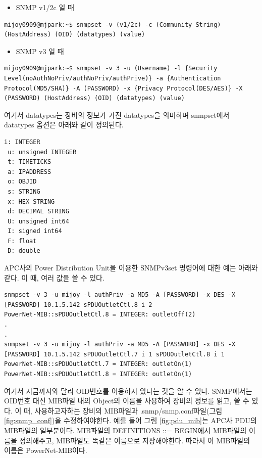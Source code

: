 \documentclass[11pt
  , a4paper
  , article
  , oneside
]{memoir}
\begin{document}
\begin{itemize}
\item SNMP v1/2c 일 때
\end{itemize}

\begin{lstlisting}[style=termstyle]
mijoy0909@mjpark:~$ snmpset -v (v1/2c) -c (Community String) (HostAddress) (OID) (datatypes) (value)
\end{lstlisting}

\begin{itemize}
\item SNMP v3 일 때
\end{itemize}

\begin{lstlisting}[style=termstyle]
mijoy0909@mjpark:~$ snmpset -v 3 -u (Username) -l {Security Level(noAuthNoPriv/authNoPriv/authPrive)} -a {Authentication Protocol(MD5/SHA)} -A (PASSWORD) -x {Privacy Protocol(DES/AES)} -X (PASSWORD) (HostAddress) (OID) (datatypes) (value)
\end{lstlisting}

여기서 datatypes는 장비의 정보가 가진 datatypes을 의미하며 snmpset에서 datatypes 옵션은 아래와 같이 정의된다.

\begin{lstlisting}[style=termstyle]
 i: INTEGER 
 u: unsigned INTEGER 
 t: TIMETICKS
 a: IPADDRESS
 o: OBJID
 s: STRING
 x: HEX STRING
 d: DECIMAL STRING
 U: unsigned int64
 I: signed int64
 F: float
 D: double
\end{lstlisting}

APC사의 Power Distribution Unit을 이용한 SNMPv3set 명령어에 대한 예는 아래와 같다. 이 때, 여러 값을 쓸 수 있다.

\begin{lstlisting}[style=termstyle]
snmpset -v 3 -u mijoy -l authPriv -a MD5 -A [PASSWORD] -x DES -X [PASSWORD] 10.1.5.142 sPDUOutletCtl.8 i 2
PowerNet-MIB::sPDUOutletCtl.8 = INTEGER: outletOff(2)
.
.
snmpset -v 3 -u mijoy -l authPriv -a MD5 -A [PASSWORD] -x DES -X [PASSWORD] 10.1.5.142 sPDUOutletCtl.7 i 1 sPDUOutletCtl.8 i 1
PowerNet-MIB::sPDUOutletCtl.7 = INTEGER: outletOn(1)
PowerNet-MIB::sPDUOutletCtl.8 = INTEGER: outletOn(1)
\end{lstlisting}

여기서 지금까지와 달리 OID번호를 이용하지 았다는 것을 알 수 있다. SNMP에서는 OID번호 대신 MIB파일 내의 Object의 이름을 사용하여 장비의 정보를 읽고, 쓸 수 있다. 이 때, 사용하고자하는 장비의 MIB파일과 .snmp/snmp.conf파일(그림 \ref{fig:snmp_conf})을 수정하여야한다.
예를 들어 그림 \ref{fig:pdu_mib}는 APC사 PDU의 MIB파일의 일부분이다. MIB파일의 DEFINITIONS ::= BEGIN에서 MIB파일의 이름을 정의해주고, MIB파일도 똑같은 이름으로 저장해야한다. 따라서 이 MIB파일의 이름은 PowerNet-MIB이다. 
\end{document}
